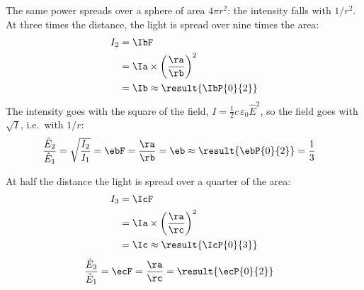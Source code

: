 \begin{abcliste}
\abc The same power spreads over a sphere of area $4\pi r^2$: the intensity falls with $1/r^2$. At three times the distance, the light is spread over nine times the area:
\begin{align}
 I_2 &= \IbF \\
   &= \Ia\times\left(\frac{\ra}{\rb}\right)^2 \\
   &= \Ib \approx \result{\IbP{0}{2}}
\end{align}
The intensity goes with the square of the field, $I = \frac{1}{2}c\,\varepsilon_0\hat E^2$, so the field goes with $\sqrt{I}$, i.e.\ with $1/r$:
\begin{align}
 \frac{\hat E_2}{\hat E_1} &= \sqrt{\frac{I_2}{I_1}} = \ebF = \frac{\ra}{\rb} = \eb \approx \result{\ebP{0}{2}} = \frac{1}{3}
\end{align}

\abc At half the distance the light is spread over a quarter of the area:
\begin{align}
 I_3 &= \IcF \\
   &= \Ia\times\left(\frac{\ra}{\rc}\right)^2 \\
   &= \Ic \approx \result{\IcP{0}{3}}
\end{align}
\begin{align}
 \frac{\hat E_3}{\hat E_1} &= \ecF = \frac{\ra}{\rc} = \result{\ecP{0}{2}}
\end{align}
\end{abcliste}
